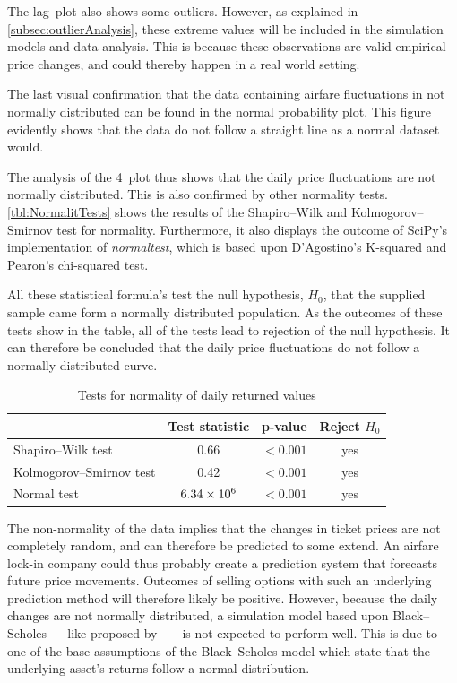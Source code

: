 The lag~plot also shows some outliers. However, as explained in \autoref{subsec:outlierAnalysis}, these extreme values will be included in the simulation models and data analysis. This is because these observations are valid empirical price changes, and could thereby happen in a real world setting.

The last visual confirmation that the data containing airfare fluctuations in not normally distributed can be found in the normal probability plot. This figure evidently shows that the data do not follow a straight line as a normal dataset would.

The analysis of the 4~plot thus shows that the daily price fluctuations are not normally distributed. This is also confirmed by other normality tests. \autoref{tbl:NormalitTests} shows the results of the Shapiro--Wilk and Kolmogorov--Smirnov test for normality. Furthermore, it also displays the outcome of SciPy's implementation of \emph{normaltest}, which is based upon D'Agostino's K-squared and Pearon's chi-squared test.

All these statistical formula's test the null hypothesis, $H_0$, that the supplied sample came form a normally distributed population. As the outcomes of these tests show in the table, all of the tests lead to rejection of the null hypothesis. It can therefore be concluded that the daily price fluctuations do not follow a normally distributed curve.


\begin{table}
\centering
\begin{tabular}{l c c c}
\toprule
~  &  Test statistic  &  p-value  &  Reject $H_0$  \\
\midrule
Shapiro--Wilk test  &  0.66  &  $< 0.001$  & yes \\
Kolmogorov--Smirnov test  & 0.42  &  $< 0.001$  & yes \\
Normal test  & $6.34 \times 10^{6}$  & $< 0.001$  & yes \\
\bottomrule
\end{tabular}
\caption{Tests for normality of daily returned values}
\label{tbl:NormalitTests}
\end{table}


The non-normality of the data implies that the changes in ticket prices are not completely random, and can therefore be predicted to some extend. An airfare lock-in company could thus probably create a prediction system that forecasts future price movements. Outcomes of selling options with such an underlying prediction method will therefore likely be positive. However, because the daily changes are not normally distributed, a simulation model based upon Black--Scholes --- like proposed by  ---- is not expected to perform well. This is due to one of the base assumptions of the Black--Scholes model which state that the underlying asset's returns follow a normal distribution.

